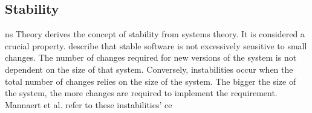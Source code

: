 \subsection{Stability} \label{subsec_on_stability}

\gls{ns} Theory derives the concept of stability from systems theory. It is considered a
crucial property. \textcite[270]{mannaert_normalized_2016}describe that stable software is
not excessively sensitive to small changes. The number of changes required for new
versions of the system is not dependent on the size of that system. Conversely,
instabilities occur when the total number of changes relies on the size of the system. The
bigger the size of the system, the more changes are required to implement the requirement.
Mannaert et al. \textcite[271]{mannaert_normalized_2016} refer to these instabilities'
\gls{ce}